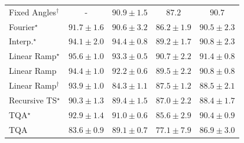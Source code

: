 \begin{tabular}{l|cccc|}
Fixed Angles$^\dagger$ & {\cellcolor[HTML]{000000}} \color[HTML]{F1F1F1} {\cellcolor{white}} \color{black} - & {\cellcolor[HTML]{0A703A}} \color[HTML]{F1F1F1} $90.9\pm 1.5$ & {\cellcolor[HTML]{218242}} \color[HTML]{F1F1F1} $87.2$ & {\cellcolor[HTML]{0B713B}} \color[HTML]{F1F1F1} $90.7$ \\
Fourier$^\star$ & {\cellcolor[HTML]{066D39}} \color[HTML]{F1F1F1} $91.7\pm 1.6$ & {\cellcolor[HTML]{0C723B}} \color[HTML]{F1F1F1} $90.6\pm 3.2$ & {\cellcolor[HTML]{268846}} \color[HTML]{F1F1F1} $86.2\pm 1.9$ & {\cellcolor[HTML]{0C723B}} \color[HTML]{F1F1F1} $90.5\pm 2.3$ \\
Interp.$^\star$ & {\cellcolor[HTML]{005E33}} \color[HTML]{F1F1F1} $94.1\pm 2.0$ & {\cellcolor[HTML]{005D33}} \color[HTML]{F1F1F1} $94.4\pm 0.8$ & {\cellcolor[HTML]{15793E}} \color[HTML]{F1F1F1} $89.2\pm 1.7$ & {\cellcolor[HTML]{0B713B}} \color[HTML]{F1F1F1} $90.8\pm 2.3$ \\
Linear Ramp$^\star$ & {\cellcolor[HTML]{005530}} \color[HTML]{F1F1F1} $95.6\pm 1.0$ & {\cellcolor[HTML]{006435}} \color[HTML]{F1F1F1} $93.3\pm 0.5$ & {\cellcolor[HTML]{0B713B}} \color[HTML]{F1F1F1} $90.7\pm 2.2$ & {\cellcolor[HTML]{076D39}} \color[HTML]{F1F1F1} $91.4\pm 0.8$ \\
Linear Ramp & {\cellcolor[HTML]{005D33}} \color[HTML]{F1F1F1} $94.4\pm 1.0$ & {\cellcolor[HTML]{026A38}} \color[HTML]{F1F1F1} $92.2\pm 0.6$ & {\cellcolor[HTML]{13773D}} \color[HTML]{F1F1F1} $89.5\pm 2.2$ & {\cellcolor[HTML]{0B713B}} \color[HTML]{F1F1F1} $90.8\pm 0.8$ \\
Linear Ramp$^\dagger$ & {\cellcolor[HTML]{006034}} \color[HTML]{F1F1F1} $93.9\pm 1.0$ & {\cellcolor[HTML]{30954F}} \color[HTML]{F1F1F1} $84.3\pm 1.1$ & {\cellcolor[HTML]{1F8142}} \color[HTML]{F1F1F1} $87.5\pm 1.2$ & {\cellcolor[HTML]{197C40}} \color[HTML]{F1F1F1} $88.5\pm 2.1$ \\
Recursive TS$^\star$ & {\cellcolor[HTML]{0E743C}} \color[HTML]{F1F1F1} $90.3\pm 1.3$ & {\cellcolor[HTML]{14783E}} \color[HTML]{F1F1F1} $89.4\pm 1.5$ & {\cellcolor[HTML]{228343}} \color[HTML]{F1F1F1} $87.0\pm 2.2$ & {\cellcolor[HTML]{197C40}} \color[HTML]{F1F1F1} $88.4\pm 1.7$ \\
TQA$^\star$ & {\cellcolor[HTML]{006636}} \color[HTML]{F1F1F1} $92.9\pm 1.4$ & {\cellcolor[HTML]{0A703A}} \color[HTML]{F1F1F1} $91.0\pm 0.6$ & {\cellcolor[HTML]{2A8D49}} \color[HTML]{F1F1F1} $85.6\pm 2.9$ & {\cellcolor[HTML]{0D733C}} \color[HTML]{F1F1F1} $90.4\pm 0.9$ \\
TQA & {\cellcolor[HTML]{349A52}} \color[HTML]{F1F1F1} $83.6\pm 0.9$ & {\cellcolor[HTML]{15793E}} \color[HTML]{F1F1F1} $89.1\pm 0.7$ & {\cellcolor[HTML]{68BE71}} \color[HTML]{000000} $77.1\pm 7.9$ & {\cellcolor[HTML]{228343}} \color[HTML]{F1F1F1} $86.9\pm 3.0$ \\

\end{tabular}
